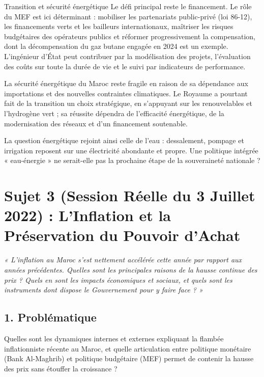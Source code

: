 \begin{copiemodele}{Transition et sécurité énergétique}
Le défi principal reste le financement. Le rôle du MEF est ici déterminant : mobiliser les partenariats public-privé (loi 86-12), les financements verts et les bailleurs internationaux, maîtriser les risques budgétaires des opérateurs publics et réformer progressivement la compensation, dont la décompensation du gaz butane engagée en 2024 est un exemple. L'ingénieur d'État peut contribuer par la modélisation des projets, l'évaluation des coûts sur toute la durée de vie et le suivi par indicateurs de performance.

La sécurité énergétique du Maroc reste fragile en raison de sa dépendance aux importations et des nouvelles contraintes climatiques. Le Royaume a pourtant fait de la transition un choix stratégique, en s'appuyant sur les renouvelables et l'hydrogène vert ; sa réussite dépendra de l'efficacité énergétique, de la modernisation des réseaux et d'un financement soutenable.

La question énergétique rejoint ainsi celle de l'eau : dessalement, pompage et irrigation reposent sur une électricité abondante et propre. Une politique intégrée « eau-énergie » ne serait-elle pas la prochaine étape de la souveraineté nationale ?
\end{copiemodele}

\section{Sujet 3 (Session Réelle du 3 Juillet 2022) : L'Inflation et la Préservation du Pouvoir d'Achat}

\begin{tcolorbox}[colback=blue!5!white,colframe=blue!75!black,title=\textbf{Énoncé Réel (3 Juillet 2022, Sujet 1 au choix)}]
\textit{« L'inflation au Maroc s'est nettement accélérée cette année par rapport aux années précédentes. Quelles sont les principales raisons de la hausse continue des prix ? Quels en sont les impacts économiques et sociaux, et quels sont les instruments dont dispose le Gouvernement pour y faire face ? »} 
\end{tcolorbox}

\subsection*{1. Problématique}
Quelles sont les dynamiques internes et externes expliquant la flambée inflationniste récente au Maroc, et quelle articulation entre politique monétaire (Bank Al-Maghrib) et politique budgétaire (MEF) permet de contenir la hausse des prix sans étouffer la croissance ?

